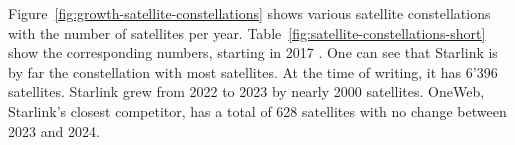 Figure~\ref{fig:growth-satellite-constellations} shows various satellite constellations with the number of satellites per year. Table~\ref{fig:satellite-constellations-short} show the corresponding numbers, starting in 2017 \cite{Richter2024}.
One can see that Starlink is by far the constellation with most satellites.
At the time of writing, it has 6'396 satellites. Starlink grew from 2022 to 2023 by nearly 2000 satellites.
OneWeb, Starlink's closest competitor, has a total of 628 satellites with no change between 2023 and 2024.

